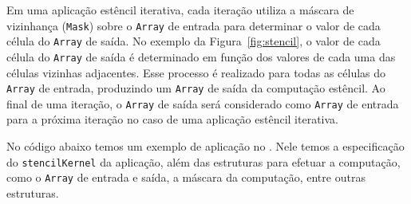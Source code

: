 %
Em uma aplicação estêncil iterativa, cada iteração utiliza a máscara de vizinhança (\texttt{Mask}) sobre o \texttt{Array} de entrada para determinar o valor de cada célula do \texttt{Array} de saída. No exemplo da Figura~\ref{fig:stencil}, o valor de cada célula do \texttt{Array} de saída é determinado em função dos valores de cada uma das células vizinhas adjacentes. Esse processo é realizado para todas as células do \texttt{Array} de entrada, produzindo um \texttt{Array} de saída da computação estêncil. Ao final de uma iteração, o \texttt{Array} de saída será considerado como \texttt{Array} de entrada para a próxima iteração no caso de uma aplicação estêncil iterativa.

No código abaixo temos um exemplo de aplicação no \fw. Nele temos a especificação do \texttt{stencilKernel} da aplicação, além das estruturas para efetuar a computação, como o \texttt{Array} de entrada e saída, a máscara da computação, entre outras estruturas.

\renewcommand{\lstlistingname}{Código}


